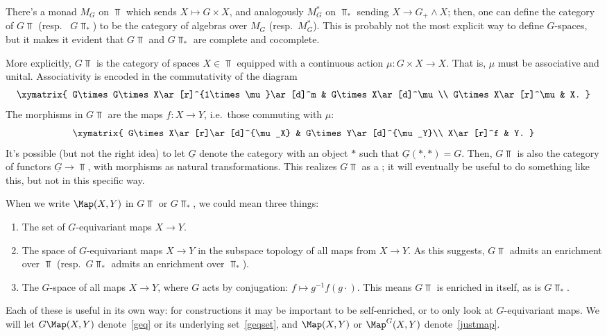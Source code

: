 There's a monad $M_G$ on $\Top$ which sends $X\mapsto G\times X$, and analogously $M_G^*$ on $\Top_*$ sending $X\to
G_+\land X$; then, one can define the category of  $G\Top$ (resp.\ 
$G\Top_*$) to be the category of algebras over $M_G$ (resp.\ $M_G^*$). This is probably not the most explicit way
to define $G$-spaces, but it makes it evident that $G\Top$ and $G\Top_*$ are complete and cocomplete.

More explicitly, $G\Top$ is the category of spaces $X\in\Top$ equipped with a continuous action $\mu\colon G\times
X\to X$. That is, $\mu$ must be associative and unital. Associativity is encoded in the commutativity of the
diagram
\[\xymatrix{
	G\times G\times X\ar[r]^{1\times\mu}\ar[d]^m & G\times X\ar[d]^\mu\\
	G\times X\ar[r]^\mu & X.
}\]
The morphisms in $G\Top$ are the  maps $f\colon X\to Y$, i.e.\ those commuting with $\mu$:
\[\xymatrix{
	G\times X\ar[r]\ar[d]^{\mu_X} & G\times Y\ar[d]^{\mu_Y}\\
	X\ar[r]^f & Y.
}\]
It's possible (but not the right idea) to let $\underline G$ denote the category with an object $*$ such that
$\underline G(*, *) = G$. Then, $G\Top$ is also the category of functors $\underline G\to\Top$, with morphisms as
natural transformations. This realizes $G\Top$ as a ; it will eventually be useful to do
something like this, but not in this specific way.

When we write $\Map(X, Y)$ in $G\Top$ or $G\Top_*$, we could mean three things:
\begin{enumerate}
	\item\label{geqset} The set of $G$-equivariant maps $X\to Y$.
	\item\label{geq} The space of $G$-equivariant maps $X\to Y$ in the subspace topology of all maps from $X\to Y$.
	As this suggests, $G\Top$ admits an enrichment over $\Top$ (resp.\ $G\Top_*$ admits an enrichment over
	$\Top_*$).
	\item\label{justmap} The $G$-space of all maps $X\to Y$, where $G$ acts by conjugation: $f\mapsto
	g^{-1}f(g\cdot)$. This means $G\Top$ is enriched in itself, as is $G\Top_*$.
\end{enumerate}
Each of these is useful in its own way: for constructions it may be important to be self-enriched, or to only look
at $G$-equivariant maps. We will let $G\Map(X,Y)$ denote~\eqref{geq} or its underlying set~\eqref{geqset}, and
$\Map(X,Y)$ or $\Map^G(X,Y)$ denote~\eqref{justmap}.

